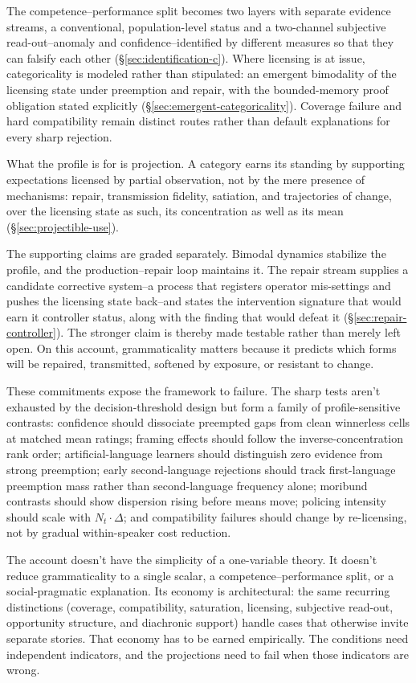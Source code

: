 \documentclass[12pt,letterpaper]{article}
\begin{document}
The competence--performance split becomes two layers with separate evidence streams, a conventional, population-level status and a two-channel subjective read-out--anomaly and confidence--identified by different measures so that they can falsify each other (\S\ref{sec:identification-c}). Where licensing is at issue, categoricality is modeled rather than stipulated: an emergent bimodality of the licensing state under preemption and repair, with the bounded-memory proof obligation stated explicitly (\S\ref{sec:emergent-categoricality}). Coverage failure and hard compatibility remain distinct routes rather than default explanations for every sharp rejection.

What the profile is for is projection. A category earns its standing by supporting expectations licensed by partial observation, not by the mere presence of mechanisms: repair, transmission fidelity, satiation, and trajectories of change, over the licensing state as such, its concentration as well as its mean (\S\ref{sec:projectible-use}).

The supporting claims are graded separately. Bimodal dynamics stabilize the profile, and the production--repair loop maintains it. The repair stream supplies a candidate corrective system--a process that registers operator mis-settings and pushes the licensing state back--and states the intervention signature that would earn it controller status, along with the finding that would defeat it (\S\ref{sec:repair-controller}). The stronger claim is thereby made testable rather than merely left open. On this account, grammaticality matters because it predicts which forms will be repaired, transmitted, softened by exposure, or resistant to change.

These commitments expose the framework to failure. The sharp tests aren't exhausted by the decision-threshold design but form a family of profile-sensitive contrasts: confidence should dissociate preempted gaps from clean winnerless cells at matched mean ratings; framing effects should follow the inverse-concentration rank order; artificial-language learners should distinguish zero evidence from strong preemption; early second-language rejections should track first-language preemption mass rather than second-language frequency alone; moribund contrasts should show dispersion rising before means move; policing intensity should scale with $N_t\cdot\Delta$; and compatibility failures should change by re-licensing, not by gradual within-speaker cost reduction.

The account doesn't have the simplicity of a one-variable theory. It doesn't reduce grammaticality to a single scalar, a competence--performance split, or a social-pragmatic explanation. Its economy is architectural: the same recurring distinctions (coverage, compatibility, saturation, licensing, subjective read-out, opportunity structure, and diachronic support) handle cases that otherwise invite separate stories. That economy has to be earned empirically. The conditions need independent indicators, and the projections need to fail when those indicators are wrong.
\end{document}
